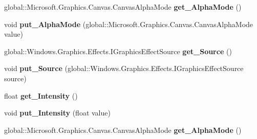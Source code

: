 \begin{DoxyCompactItemize}
\mbox{\label{interface_microsoft_1_1_graphics_1_1_canvas_1_1_effects_1_1_i_sepia_effect_af0e3b772c6a8f51c2b8bc71a3c7e2e09}} 
global\+::\+Microsoft.\+Graphics.\+Canvas.\+Canvas\+Alpha\+Mode {\bfseries get\+\_\+\+Alpha\+Mode} ()
\item 
\mbox{\label{interface_microsoft_1_1_graphics_1_1_canvas_1_1_effects_1_1_i_sepia_effect_a28750df56d32d0e2653893f6de5805d7}} 
void {\bfseries put\+\_\+\+Alpha\+Mode} (global\+::\+Microsoft.\+Graphics.\+Canvas.\+Canvas\+Alpha\+Mode value)
\item 
\mbox{\label{interface_microsoft_1_1_graphics_1_1_canvas_1_1_effects_1_1_i_sepia_effect_ac7c0465ec6fc4284a0f0205b572f78a8}} 
global\+::\+Windows.\+Graphics.\+Effects.\+I\+Graphics\+Effect\+Source {\bfseries get\+\_\+\+Source} ()
\item 
\mbox{\label{interface_microsoft_1_1_graphics_1_1_canvas_1_1_effects_1_1_i_sepia_effect_a1673f79e0f93155b9778ad30b74eb86b}} 
void {\bfseries put\+\_\+\+Source} (global\+::\+Windows.\+Graphics.\+Effects.\+I\+Graphics\+Effect\+Source source)
\item 
\mbox{\label{interface_microsoft_1_1_graphics_1_1_canvas_1_1_effects_1_1_i_sepia_effect_aee3d7d45c759c48558e8ac58694d0f0f}} 
float {\bfseries get\+\_\+\+Intensity} ()
\item 
\mbox{\label{interface_microsoft_1_1_graphics_1_1_canvas_1_1_effects_1_1_i_sepia_effect_a9682e9765a9acc23c0ba196c33ca8367}} 
void {\bfseries put\+\_\+\+Intensity} (float value)
\item 
\mbox{\label{interface_microsoft_1_1_graphics_1_1_canvas_1_1_effects_1_1_i_sepia_effect_af0e3b772c6a8f51c2b8bc71a3c7e2e09}} 
global\+::\+Microsoft.\+Graphics.\+Canvas.\+Canvas\+Alpha\+Mode {\bfseries get\+\_\+\+Alpha\+Mode} ()

\end{DoxyCompactItemize}
